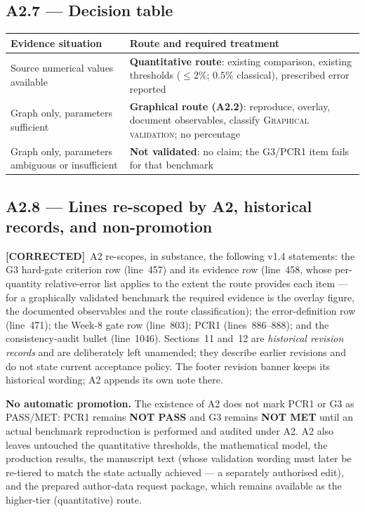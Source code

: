 \documentclass[11pt,a4paper]{article}
\newcommand{\COR}{{\color{corcol}\textbf{[CORRECTED]}}}
\begin{document}
\subsection*{A2.7 --- Decision table}
\begin{center}
\begin{tabularx}{\textwidth}{@{}L{6.2cm} Y@{}}
\toprule
Evidence situation & Route and required treatment \\
\midrule
Source numerical values available & \textbf{Quantitative route}: existing comparison, existing thresholds
($\le2\%$; $0.5\%$ classical), prescribed error reported \\
\midrule
Graph only, parameters sufficient & \textbf{Graphical route (A2.2)}: reproduce, overlay, document
observables, classify \textsc{Graphical validation}; no percentage \\
\midrule
Graph only, parameters ambiguous or insufficient & \textbf{Not validated}: no claim; the G3/PCR1 item
fails for that benchmark \\
\bottomrule
\end{tabularx}
\end{center}

\subsection*{A2.8 --- Lines re-scoped by A2, historical records, and non-promotion}
\COR\ A2 re-scopes, in substance, the following v1.4 statements: the G3 hard-gate criterion row
(line~457) and its evidence row (line~458, whose per-quantity relative-error list applies to the extent
the route provides each item --- for a graphically validated benchmark the required evidence is the
overlay figure, the documented observables and the route classification); the error-definition row
(line~471); the Week-8 gate row (line~803); PCR1 (lines~886--888); and the consistency-audit bullet
(line~1046). Sections~11 and~12 are \emph{historical revision records} and are deliberately left
unamended; they describe earlier revisions and do not state current acceptance policy. The footer
revision banner keeps its historical wording; A2 appends its own note there.

\textbf{No automatic promotion.} The existence of A2 does not mark PCR1 or G3 as PASS/MET: PCR1 remains
\textbf{NOT PASS} and G3 remains \textbf{NOT MET} until an actual benchmark reproduction is performed and
audited under A2. A2 also leaves untouched the quantitative thresholds, the mathematical model, the
production results, the manuscript text (whose validation wording must later be re-tiered to match the
state actually achieved --- a separately authorised edit), and the prepared author-data request package,
which remains available as the higher-tier (quantitative) route.
\end{document}
